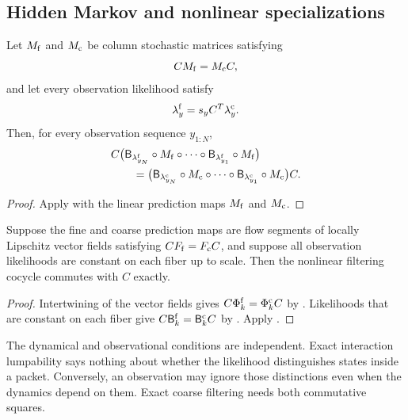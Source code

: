 \subsection{Hidden Markov and nonlinear specializations}

\begin{PRIQcorollary}\label{PRIQ:cor:hmm-lumpability}
Let $M_{\mathrm f}$ and $M_{\mathrm c}$ be column stochastic matrices satisfying
\[
  CM_{\mathrm f}=M_{\mathrm c}C,
\]
and let every observation likelihood satisfy
\[
  \lambda_y^{\mathrm f}=s_yC^T\lambda_y^{\mathrm c}.
\]
Then, for every observation sequence $y_{1:N}$,
\begin{align*}
&C\bigl(
\mathsf B_{\lambda_{y_N}^{\mathrm f}}\circ M_{\mathrm f}
\circ\cdots\circ
\mathsf B_{\lambda_{y_1}^{\mathrm f}}\circ M_{\mathrm f}
\bigr)\\
&\qquad=
\bigl(
\mathsf B_{\lambda_{y_N}^{\mathrm c}}\circ M_{\mathrm c}
\circ\cdots\circ
\mathsf B_{\lambda_{y_1}^{\mathrm c}}\circ M_{\mathrm c}
\bigr)C.
\end{align*}
\end{PRIQcorollary}

\begin{proof}
Apply  with the linear prediction maps $M_{\mathrm f}$ and $M_{\mathrm c}$.
\end{proof}

\begin{PRIQcorollary}\label{PRIQ:cor:nonlinear-filtering}
Suppose the fine and coarse prediction maps are flow segments of locally Lipschitz vector fields satisfying $CF_{\mathrm f}=F_{\mathrm c}C$, and suppose all observation likelihoods are constant on each fiber up to scale.  Then the nonlinear filtering cocycle commutes with $C$ exactly.
\end{PRIQcorollary}

\begin{proof}
Intertwining of the vector fields gives $C\Phi_k^{\mathrm f}=\Phi_k^{\mathrm c}C$ by .  Likelihoods that are constant on each fiber give $C\mathsf B_k^{\mathrm f}=\mathsf B_k^{\mathrm c}C$ by .  Apply .
\end{proof}

\begin{PRIQremark}\label{PRIQ:rem:two-closure-requirements}
The dynamical and observational conditions are independent.  Exact interaction lumpability says nothing about whether the likelihood distinguishes states inside a packet.  Conversely, an observation may ignore those distinctions even when the dynamics depend on them.  Exact coarse filtering needs both commutative squares.
\end{PRIQremark}

